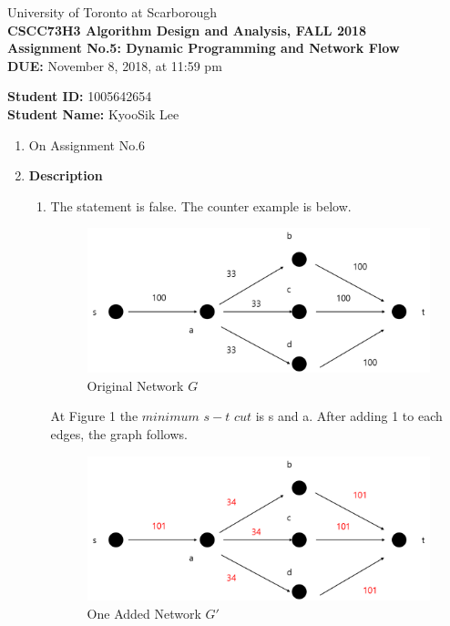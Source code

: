 \documentclass[a4paper,11pt]{article}
\begin{document}
\begin{center}
University of Toronto at Scarborough\\[0.1in]
{\bf CSCC73H3 Algorithm Design and Analysis, FALL 2018} \\[0.1in]
{\large{\bf Assignment No.5: Dynamic Programming and Network Flow}}\\[0.1in]
{\bf DUE:} November 8, 2018, at 11:59 pm
\end{center}


\vspace{0.1in}
\noindent
{\bf Student ID:} 1005642654 \\[0.15in]
{\bf Student Name:} KyooSik Lee
\vspace{0.3in}

\vspace{0.3in}
\begin{enumerate}

\item

On Assignment No.6

\item 

{\bf Description}

\begin{enumerate}

	\item
	The statement is false. The counter example is below.

	\begin{figure}[hbt]
		\centering
		\includegraphics[scale=0.4]{figure1.png}
		\caption{Original Network $G$}
	\end{figure}

	At Figure 1 the $minimum$ $s-t$ $cut$ is s and a. After adding 1 to each edges, the graph follows.

	\begin{figure}[hbt]
		\centering
		\includegraphics[scale=0.4]{figure2.png}
		\caption{One Added Network $G'$}
	\end{figure}


\end{enumerate}
\end{enumerate}
\end{document}
